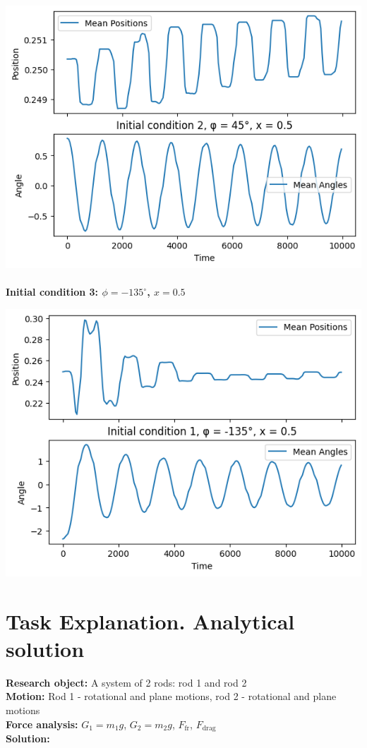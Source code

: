 \documentclass{article}
\begin{document}
\includegraphics*[scale=0.7]{plots/init2!.png}\\\\


\textbf{Initial condition 3: $\phi = -135^\circ$, $x = 0.5$}

\includegraphics*[scale=0.8]{plots/init3!.png}

\section{Task Explanation. Analytical solution}

\textbf{Research object:} A system of 2 rods: rod 1 and rod 2\\
\textbf{Motion:} Rod 1 - rotational and plane motions, rod 2 - rotational and plane motions\\
\textbf{Force analysis:} $G_1 = m_1 g$, $G_2 = m_2 g$, $F_\text{fr}$, $F_\text{drag}$\\
\textbf{Solution:}
\end{document}
